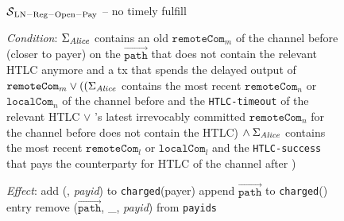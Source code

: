 \begin{figure}[H]
  \begin{simulatorbox}{$\mathcal{S}{}_{\mathrm{LN - Reg - Open - Pay}}$ -- no
  timely fulfill}
    \begin{algorithmic}[1]
      \Statex \textit{Condition}:
      \Indent
        \State $\Sigma_{\mathit{Alice}}$ contains an old $\mathtt{remoteCom}_m$ of the
        channel before \alice{} (closer to payer) on the
        $\overrightarrow{\mathtt{path}}$ that does not contain the relevant HTLC
        anymore and a tx that spends the delayed output of
        $\mathtt{remoteCom}_m \vee ((\Sigma_{\mathit{Alice}}$ contains the most recent
        $\mathtt{remoteCom}_n$ or $\mathtt{localCom}_n$ of the channel before
        \alice{} and the \texttt{HTLC-timeout} of the relevant HTLC
        $\vee$ \alice's latest irrevocably committed $\mathtt{remoteCom}_n$ for
        the channel before \alice{} does not contain the HTLC) $\wedge \:
        \Sigma_{\mathit{Alice}}$ contains the most recent $\mathtt{remoteCom}_l$ or
        $\mathtt{localCom}_l$ and the \texttt{HTLC-success} that pays the
        counterparty for HTLC of the channel after \alice{})
        \label{alg:sim:resolvepay:nofulfill:cond}
      \EndIndent
      \Statex

      \Statex \textit{Effect}:
      \Indent
        \State add (\alice, \textit{payid}) to \texttt{charged}(payer)
          \State append $\overrightarrow{\mathtt{path}}$ to
          \texttt{charged}(\alice) entry
        \EndIf
        \State remove ($\overrightarrow{\mathtt{path}}$, \_,
        \textit{payid}) from \texttt{payids}
      \EndIndent
    \end{algorithmic}
  \end{simulatorbox}
  \caption{}
  \label{alg:sim:resolvepay:nofulfill}
\end{figure}

